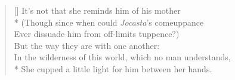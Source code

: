 \settowidth{\versewidth}{In the wilderness of this world, which no man understands,}
\begin{verse}[\versewidth]
\vin It's not that she reminds him of his mother\\*
\vin \vin (Though since when could \textit{Jocasta}'s comeuppance\\
\vin \vin Ever dissuade him from off-limits tuppence?)\\
\vin But the way they are with one another:\\
In the wilderness of this world, which no man understands,\\*
She cupped a little light for him between her hands.
\end{verse}
